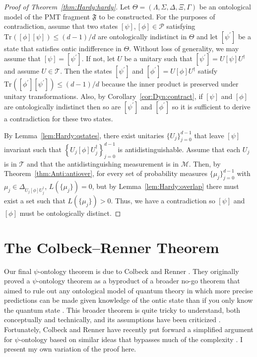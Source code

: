 \documentclass[DIV=calc,paper=a4,fontsize=11pt,twocolumn]{scrartcl} %
\theoremstyle{definition}
\theoremstyle{plain}
\newcommand{\Proj}[1]{\ensuremath{\left [ #1 \right ]}}
\newcommand{\Tr}[2][]{\ensuremath{\text{Tr}_{#1} \left ( #2 \right )}}
\begin{document}
\begin{proof}[Proof of Theorem~\ref{thm:Hardy:hardy}]
Let $\Theta = (\Lambda, \Sigma, \Delta, \Xi, \Gamma)$ be an ontological
model of the PMT fragment $\mathfrak{F}$ to be constructed.  For the
purposes of contradiction, assume that two states $\Proj{\psi},
\Proj{\phi} \in \mathcal{P}$ satisfying $\Tr{\Proj{\phi}\Proj{\psi}}
\leq (d-1)/d$ are ontologically indistinct in $\Theta$ and let
$\Proj{\psi^{\prime}}$ be a state that satisfies ontic indifference
in $\Theta$.  Without loss of generality, we may assume that
$\Proj{\psi} = \Proj{\psi^{\prime}}$.  If not, let $U$ be a unitary
such that $\Proj{\psi^{\prime}} = U \Proj{\psi} U^{\dagger}$ and
assume $U \in \mathcal{T}$.  Then the states $\Proj{\psi^{\prime}}$
and $\Proj{\phi^{\prime}} = U \Proj{\phi} U^{\dagger}$ satisfy
$\Tr{\Proj{\phi^{\prime}}\Proj{\psi^{\prime}}} \leq (d-1)/d$ because
the inner product is preserved under unitary transformations.  Also,
by Corollary~\ref{cor:Dyn:contract}, if $\Proj{\psi}$ and
$\Proj{\phi}$ are ontologically indistinct then so are
$\Proj{\psi^{\prime}}$ and $\Proj{\phi^{\prime}}$ so it is
sufficient to derive a contradiction for these two states.

By Lemma~\ref{lem:Hardy:qstates}, there exist unitaries
$\{U_j\}_{j=0}^{d-1}$ that leave $\Proj{\psi}$ invariant such that
$\left \{ U_j \Proj{\phi}U_j^{\dagger} \right \}_{j=0}^{d-1}$ is
antidistinguishable.  Assume that each $U_j$ is in $\mathcal{T}$ and
that the antidistinguishing measurement is in $\mathcal{M}$.  Then,
by Theorem~\ref{thm:Anti:antiover}, for every set of probability
measures $\{\mu_j\}_{j=0}^{d-1}$ with $\mu_j \in \Delta_{U_j
\Proj{\phi}U_j^{\dagger}}$, $L(\{\mu_j\}) = 0$, but by
Lemma~\ref{lem:Hardy:overlap} there must exist a set such that
$L(\{\mu_j\}) > 0$.  Thus, we have a contradiction so $\Proj{\psi}$
and $\Proj{\phi}$ must be ontologically distinct.
\end{proof}

\section{The Colbeck--Renner Theorem}

\label{CR}

Our final $\psi$-ontology theorem is due to Colbeck and Renner
\cite{Colbeck2013a}.  They originally proved a $\psi$-ontology theorem
as a byproduct of a broader no-go theorem that aimed to rule out any
ontological model of quantum theory in which more precise predictions
can be made given knowledge of the ontic state than if you only know
the quantum state \cite{Colbeck2011, Colbeck2012a, Colbeck2012}.  This
broader theorem is quite tricky to understand, both conceptually and
technically, and its assumptions have been criticized
\cite{Ghirardi2013, Ghirardi2013a, Ghirardi2013b}.  Fortunately,
Colbeck and Renner have recently put forward a simplified argument for
$\psi$-ontology based on similar ideas that bypasses much of the
complexity \cite{Colbeck2013a}.  I present my own variation of the
proof here.
\end{document}

